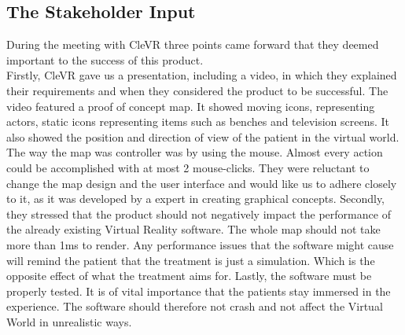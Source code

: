 \documentclass[11pt]{article}
\begin{document}
	\subsection{The Stakeholder Input}
    During the meeting with CleVR three points came forward that they deemed important to the success of this product. \\
    Firstly, CleVR gave us a presentation, including a video, in which they explained their requirements and when they considered the product to be successful. The video featured a proof of concept map. It showed moving icons, representing actors, static icons representing items such as benches and television screens. It also showed the position and direction of view of the patient in the virtual world. The way the map was controller was by using the mouse. Almost every action could be accomplished with at most 2 mouse-clicks. They were reluctant to change the map design and the user interface and would like us to adhere closely to it, as it was developed by a expert in creating graphical concepts.
    \newline
    Secondly, they stressed that the product should not negatively impact the performance of the already existing Virtual Reality software. The whole map should not take more than 1ms to render. Any performance issues that the software might cause will remind the patient that the treatment is just a simulation. Which is the opposite effect of what the treatment aims for.
    \newline
    Lastly, the software must be properly tested. It is of vital importance that the patients stay immersed in the experience. The software should therefore not crash and not affect the Virtual World in unrealistic ways.
\end{document}
